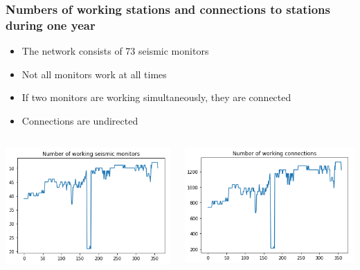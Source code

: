 \documentclass{beamer}
\begin{document}
\begin{frame}
\frametitle{Numbers of working stations and connections to stations during one year}

\begin{itemize}
\item The network consists of 73 seismic monitors
\item Not all monitors work at all times
\item If two monitors are working simultaneously, they are connected
\item Connections are undirected
\end{itemize}

\begin{columns}
\includegraphics[width=\textwidth]{working_monitors.png}

\includegraphics[width=\textwidth]{working_connections.png}
\end{columns}
\end{frame}
\end{document}
